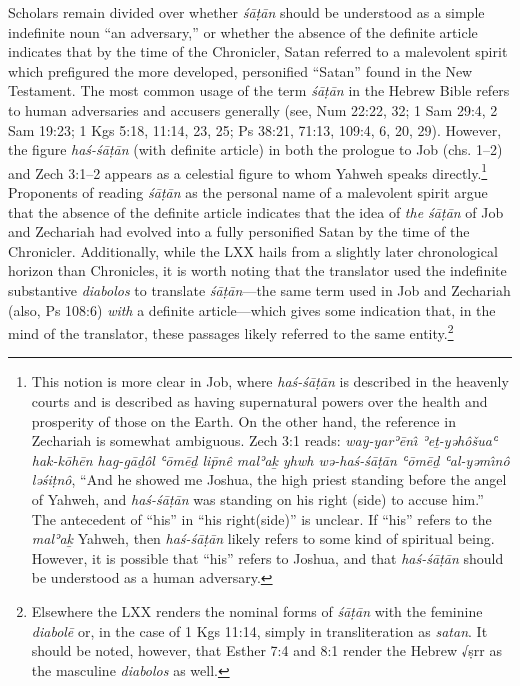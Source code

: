  Scholars remain divided over whether \emph{śāṭān} should be understood as a simple indefinite noun ``an adversary,'' \autocites{stokes_jbl2009}[114--117]{japhet2009}[370--390]{japhet1993} or whether the absence of the definite article indicates that by the time of the Chronicler, Satan referred to a malevolent spirit which prefigured the more developed, personified ``Satan'' found in the New Testament.\autocite[4--5]{rollston_keith-stuckenbruck2016} The most common usage of the term \emph{śāṭān} in the Hebrew Bible refers to human adversaries and accusers generally (see, Num 22:22, 32; 1 Sam 29:4, 2 Sam 19:23; 1 Kgs 5:18, 11:14, 23, 25; Ps 38:21, 71:13, 109:4, 6, 20, 29). However, the figure \emph{haś-śāṭān} (with definite article) in both the prologue to Job (chs. 1--2) and Zech 3:1--2 appears as a celestial figure to whom Yahweh speaks directly.\footnote{This notion is   more clear in Job, where \emph{haś-śāṭān} is described in the heavenly   courts and is described as having supernatural powers over the health   and prosperity of those on the Earth. On the other hand, the reference   in Zechariah is somewhat ambiguous. Zech 3:1 reads: \emph{way-yarʾēnı̂   ʾeṯ-yəhôšuaʿ hak-kōhēn hag-gāḏôl ʿōmēḏ lip̄nê malʾaḵ yhwh wə-haś-śāṭān   ʿōmēḏ ʿal-yəmı̂nô ləśiṭnô}, ``And he showed me Joshua, the high priest   standing before the angel of Yahweh, and \emph{haś-śāṭān} was standing   on his right (side) to accuse him.'' The antecedent of ``his'' in   ``his right(side)'' is unclear. If ``his'' refers to the \emph{malʾaḵ}   Yahweh, then \emph{haś-śāṭān} likely refers to some kind of spiritual   being. However, it is possible that ``his'' refers to Joshua, and that   \emph{haś-śāṭān} should be understood as a human adversary.} Proponents of reading \emph{śāṭān} as the personal name of a malevolent spirit argue that the absence of the definite article indicates that the idea of \emph{the śāṭān} of Job and Zechariah had evolved into a fully personified Satan by the time of the Chronicler.\autocites[216--217]{braun1986}[107]{coggins1976}[Rollston also finds this reading compelling, though, not without difficulties. See,][4--5]{rollston_keith-stuckenbruck2016} Additionally, while the LXX hails from a slightly later chronological horizon than Chronicles, it is worth noting that the translator used the indefinite substantive \emph{diabolos} to translate \emph{śāṭān}---the same term used in Job and Zechariah (also, Ps 108:6) \emph{with} a definite article---which gives some indication that, in the mind of the translator, these passages likely referred to the same entity.\footnote{Elsewhere the LXX   renders the nominal forms of \emph{śāṭān} with the feminine   \emph{diabolē} or, in the case of 1 Kgs 11:14, simply in   transliteration as \emph{satan}. It should be noted, however, that   Esther 7:4 and 8:1 render the Hebrew √ṣrr as the masculine   \emph{diabolos} as well.} 

